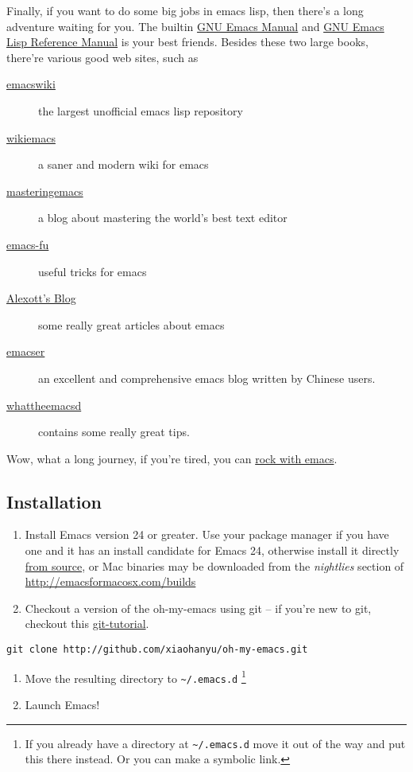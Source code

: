 \documentclass[11pt]{article}
\begin{document}
Finally, if you want to do some big jobs in emacs lisp, then there's a long
adventure waiting for you. The builtin \href{http://www.gnu.org/software/emacs/manual/}{GNU Emacs Manual} and \href{http://www.gnu.org/software/emacs/manual/html_node/elisp/}{GNU Emacs Lisp
Reference Manual} is your best friends. Besides these two large books, there're
various good web sites, such as
\begin{description}
\item[{\href{http://www.emacswiki.org/}{emacswiki}}] the largest unofficial emacs lisp repository
\item[{\href{http://wikemacs.org/index.php/Main_Page}{wikiemacs}}] a saner and modern wiki for emacs
\item[{\href{http://www.masteringemacs.org/}{masteringemacs}}] a blog about mastering the world's best text editor
\item[{\href{http://emacs-fu.blogspot.com/}{emacs-fu}}] useful tricks for emacs
\item[{\href{http://alexott.net/en/emacs/}{Alexott's Blog}}] some really great articles about emacs
\item[{\href{http://alexott.net/en/emacs/}{emacser}}] an excellent and comprehensive emacs blog written by Chinese
users.
\item[{\href{http://whattheemacsd.com/}{whattheemacsd}}] contains some really great tips.
\end{description}

Wow, what a long journey, if you're tired, you can \href{http://emacsrocks.com/}{rock with emacs}.

\subsection*{Installation}
\label{sec-2-2}
\begin{enumerate}
\item Install Emacs version 24 or greater.  Use your package manager if
you have one and it has an install candidate for Emacs 24,
otherwise install it directly \href{http://savannah.gnu.org/projects/emacs/}{from source}, or Mac binaries may be
downloaded from the \emph{nightlies} section of
\url{http://emacsformacosx.com/builds}
\item Checkout a version of the oh-my-emacs using git -- if you're new to
git, checkout this \href{http://www.kernel.org/pub/software/scm/git/docs/gittutorial.html}{git-tutorial}.
\end{enumerate}
\begin{verbatim}
git clone http://github.com/xiaohanyu/oh-my-emacs.git
\end{verbatim}
\begin{enumerate}
\item Move the resulting directory to \texttt{\textasciitilde{}/.emacs.d} \footnote{If you already have a directory at \texttt{\textasciitilde{}/.emacs.d} move it out of the way and
put this there instead. Or you can make a symbolic link.}
\item Launch Emacs!
\end{enumerate}
\end{document}
